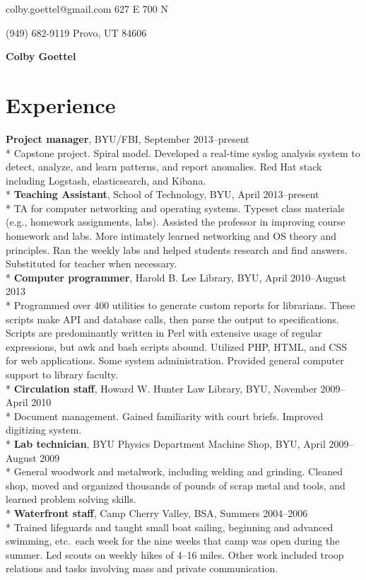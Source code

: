 \documentclass[10pt]{article}
\begin{document}
{\noindent colby.goettel@gmail.com \hfill 627 E 700 N}

{\noindent (949) 682-9119 \hfill Provo, UT 84606}

\begin{center}
    {\bfseries \Large Colby Goettel} \\
\end{center}
\vspace{-20pt}

\section*{Experience}
\textbf{Project manager}, BYU/FBI, September 2013--present \\*
Capstone project. Spiral model. Developed a real-time syslog analysis system to detect, analyze, and learn patterns, and report anomalies. Red Hat stack including Logstash, elasticsearch, and Kibana. \\*
\textbf{Teaching Assistant}, School of Technology, BYU, April 2013--present \\*
TA for computer networking and operating systems. Typeset class materials (e.g., homework assignments, labs). Assisted the professor in improving course homework and labs. More intimately learned networking and OS theory and principles. Ran the weekly labs and helped students research and find answers. Substituted for teacher when necessary. \\*
\textbf{Computer programmer}, Harold B. Lee Library, BYU, April 2010--August 2013 \\*
Programmed over 400 utilities to generate custom reports for librarians. These scripts make API and database calls, then parse the output to specifications. Scripts are predominantly written in Perl with extensive usage of regular expressions, but awk and bash scripts abound. Utilized PHP, HTML, and CSS for web applications. Some system administration. Provided general computer support to library faculty. \\*
\textbf{Circulation staff}, Howard W. Hunter Law Library, BYU, November 2009--April 2010 \\*
Document management. Gained familiarity with court briefs. Improved digitizing system. \\*
\textbf{Lab technician}, BYU Physics Department Machine Shop, BYU, April 2009--August 2009 \\*
General woodwork and metalwork, including welding and grinding. Cleaned shop, moved and organized thousands of pounds of scrap metal and tools, and learned problem solving skills. \\*
\textbf{Waterfront staff}, Camp Cherry Valley, BSA, Summers 2004--2006 \\*
Trained lifeguards and taught small boat sailing, beginning and advanced swimming, etc.\ each week for the nine weeks that camp was open during the summer. Led scouts on weekly hikes of 4--16 miles. Other work included troop relations and tasks involving mass and private communication.
\end{document}
